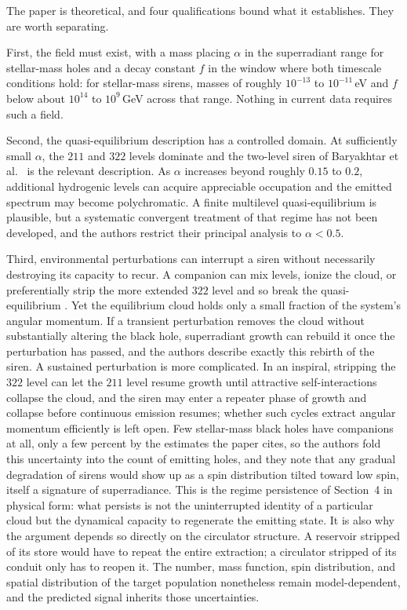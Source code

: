 \documentclass[11pt]{article}
\begin{document}
The paper is theoretical, and four qualifications bound what it establishes. They are worth separating.

First, the field must exist, with a mass placing $\alpha$ in the superradiant range for stellar-mass holes and a decay constant $f$ in the window where both timescale conditions hold: for stellar-mass sirens, masses of roughly $10^{-13}$ to $10^{-11}$\,eV and $f$ below about $10^{14}$ to $10^{9}$\,GeV across that range. Nothing in current data requires such a field.

Second, the quasi-equilibrium description has a controlled domain. At sufficiently small $\alpha$, the $211$ and $322$ levels dominate and the two-level siren of Baryakhtar et al.\ \cite{Baryakhtar2021} is the relevant description. As $\alpha$ increases beyond roughly $0.15$ to $0.2$, additional hydrogenic levels can acquire appreciable occupation and the emitted spectrum may become polychromatic. A finite multilevel quasi-equilibrium is plausible, but a systematic convergent treatment of that regime has not been developed, and the authors restrict their principal analysis to $\alpha < 0.5$.

Third, environmental perturbations can interrupt a siren without necessarily destroying its capacity to recur. A companion can mix levels, ionize the cloud, or preferentially strip the more extended $322$ level and so break the quasi-equilibrium \cite{BaumannChiaPorto2019,Takahashi2024}. Yet the equilibrium cloud holds only a small fraction of the system's angular momentum. If a transient perturbation removes the cloud without substantially altering the black hole, superradiant growth can rebuild it once the perturbation has passed, and the authors describe exactly this rebirth of the siren. A sustained perturbation is more complicated. In an inspiral, stripping the $322$ level can let the $211$ level resume growth until attractive self-interactions collapse the cloud, and the siren may enter a repeater phase of growth and collapse before continuous emission resumes; whether such cycles extract angular momentum efficiently is left open. Few stellar-mass black holes have companions at all, only a few percent by the estimates the paper cites, so the authors fold this uncertainty into the count of emitting holes, and they note that any gradual degradation of sirens would show up as a spin distribution tilted toward low spin, itself a signature of superradiance. This is the regime persistence of Section~4 in physical form: what persists is not the uninterrupted identity of a particular cloud but the dynamical capacity to regenerate the emitting state. It is also why the argument depends so directly on the circulator structure. A reservoir stripped of its store would have to repeat the entire extraction; a circulator stripped of its conduit only has to reopen it. The number, mass function, spin distribution, and spatial distribution of the target population nonetheless remain model-dependent, and the predicted signal inherits those uncertainties.
\end{document}

